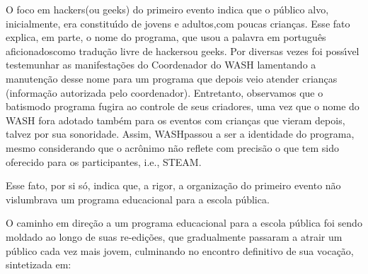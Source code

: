 \documentclass[
12pt,		%
openright,	%
twoside,  %
a4paper,			%
chapter=TITLE,		%
english,			%
french,				%
spanish,			%
brazil				%
]{USPSC-classe/USPSC}
\begin{document}
O foco em \textquotedbl hackers\textquotedbl  (ou \textquotedbl geeks\textquotedbl ) do primeiro evento indica que o p\'ublico alvo, inicialmente, era constitu\'{\i}do de jovens e adultos,com  poucas crian\c{c}as. Esse fato explica, em parte, o nome do programa, que usou a palavra em portugu\^es \textquotedbl aficionados\textquotedbl  como tradu\c{c}\~ao livre de \textquotedbl hackers\textquotedbl  ou \textquotedbl geeks\textquotedbl . Por diversas vezes foi poss\'{\i}vel testemunhar as manifesta\c{c}\~oes do Coordenador do WASH lamentando a manuten\c{c}\~ao desse nome para um programa que depois veio atender crian\c{c}as (informa\c{c}\~ao autorizada pelo coordenador). Entretanto, observamos que o \textquotedbl batismo\textquotedbl  do programa fugira ao controle de seus criadores, uma vez que o nome do WASH fora adotado tamb\'em para os eventos com crian\c{c}as que vieram depois, talvez por sua sonoridade. Assim, \textquotedbl WASH\textquotedbl  passou a ser a identidade do programa, mesmo considerando que o acr\^onimo n\~ao reflete com precis\~ao o que tem sido oferecido para os participantes, i.e., STEAM.

















Esse fato, por si s\'o, indica que, a rigor, a organiza\c{c}\~ao do primeiro evento n\~ao vislumbrava um programa educacional para a escola p\'ublica.

















O caminho em dire\c{c}\~ao a um programa educacional para a escola p\'ublica foi sendo moldado ao longo de suas re-edi\c{c}\~oes, que gradualmente passaram a atrair um p\'ublico cada vez mais jovem, culminando no encontro definitivo de sua voca\c{c}\~ao, sintetizada em:
\end{document}
